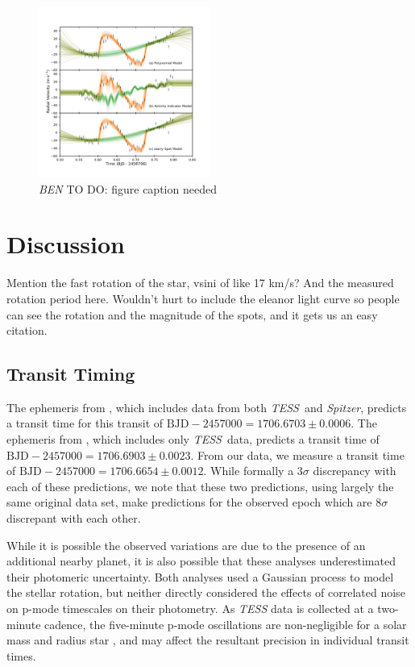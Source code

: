 \documentclass[twocolumn]{aastex62}
\newcommand{\tess}{{\it TESS}}
\newcommand{\spitz}{{\it Spitzer}}
\newcommand{\todo}[3]{{\color{#2} \emph{#1} TO DO: #3}}
\newcommand{\btmtodo}[1]{\todo{BEN}{blue}{#1}}
\begin{document}
\begin{figure}[!tbh]
  \begin{center}
    \includegraphics[width=0.5\textwidth, trim={0cm 0.0cm 1cm 1cm}, clip=true]{../figures/model_comp.pdf}
   \end{center}
  \caption{\btmtodo{figure caption needed}}
  \label{fig:models}
\end{figure}

\section{Discussion}
\label{sec:discussion}



Mention the fast rotation of the star, vsini of like 17 km/s? And the measured rotation period here. Wouldn't hurt to include the eleanor light curve so people can see the rotation and the magnitude of the spots, and it gets us an easy citation.

\subsection{Transit Timing}

The ephemeris from \citet{Newton19}, which includes data from both \tess\ and \spitz, predicts a transit time for this transit of $\textrm{BJD}- 2457000 = 1706.6703 \pm 0.0006$. 
The ephemeris from \citet{Benatti19}, which includes only \tess\ data, predicts a transit time of  $\textrm{BJD}- 2457000 = 1706.6903 \pm 0.0023$. 
From our data, we measure a transit time of $\textrm{BJD}- 2457000 = 1706.6654 \pm  0.0012$. 
While formally a $3\sigma$ discrepancy with each of these predictions, we note that these two predictions, using largely the same original data set, make predictions for the observed epoch which are $8\sigma$ discrepant with each other. 

While it is possible the observed variations are due to the presence of an additional nearby planet, it is also possible that these analyses underestimated their photomeric uncertainty. 
Both analyses used a Gaussian process to model the stellar rotation, but neither directly considered the effects of correlated noise on p-mode timescales on their photometry. 
As \textit{TESS} data is collected at a two-minute cadence, the five-minute p-mode oscillations are non-negligible for a solar mass and radius star \citep{Chaplin13}, and may affect the resultant precision in individual transit times.
\end{document}
